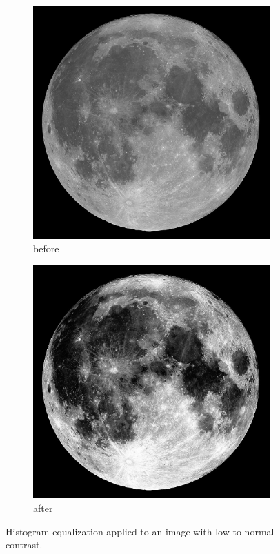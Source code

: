 \documentclass[11pt,a4paper]{article}
\begin{document}
\clearpage

\begin{figure}[ht]
	\centering
	\begin{subfigure}[h]{0.45\textwidth}
		\includegraphics[width=\textwidth]{figs/lc3_gray}
		\caption{before}
		\label{fig:moon_bef}
	\end{subfigure}
	\begin{subfigure}[h]{0.45\textwidth}
		\includegraphics[width=\textwidth]{figs/lc3_ce}
		\caption{after}
		\label{fig:moon_aft}
	\end{subfigure}	
	
	\caption{Histogram equalization applied to an image with low to normal contrast.}
	\label{fig:ce_norm_moon}
\end{figure}
\end{document}
